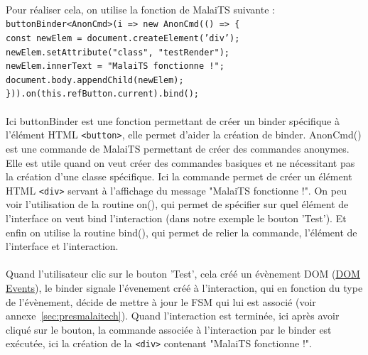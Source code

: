 \documentclass[11pt, a4paper, pdftex]{article}
\newcommand{\info}{\texttt}
\begin{document}
\begin{appendices}
        \paragraph{}
            Pour réaliser cela, on utilise la fonction de MalaiTS suivante : \\
        \info{buttonBinder<AnonCmd>(i => new AnonCmd(() => \{ \\
        const newElem = document.createElement('div'); \\
        newElem.setAttribute("class", "testRender"); \\
        newElem.innerText = "MalaiTS fonctionne !"; \\
        document.body.appendChild(newElem); \\
        \})).on(this.refButton.current).bind();}
        \paragraph{}
            Ici buttonBinder est une fonction permettant de créer un binder spécifique à l'élément HTML \info{<button>}, elle permet d'aider la création de binder.
            AnonCmd() est une commande de MalaiTS permettant de créer des commandes anonymes.
            Elle est utile quand on veut créer des commandes basiques et ne nécessitant pas la création d'une classe spécifique.
            Ici la commande permet de créer un élément HTML \info{<div>} servant à l'affichage du message "MalaiTS fonctionne !".
            On peu voir l'utilisation de la routine on(), qui permet de spécifier sur quel élément de l'interface on veut bind l'interaction (dans notre exemple le bouton 'Test').
            Et enfin on utilise la routine bind(), qui permet de relier la commande, l'élément de l'interface et l'interaction.
        \paragraph{}
            Quand l'utilisateur clic sur le bouton 'Test', cela créé un évènement DOM (\href{https://developer.mozilla.org/en-US/docs/Web/Events}{DOM Events}), le binder signale l'évenement créé à l'interaction, qui en fonction du type de l'évènement,
            décide de mettre à jour le FSM qui lui est associé (voir annexe~\ref{sec:presmalaitech}).
            Quand l'interaction est terminée, ici après avoir cliqué sur le bouton, la commande associée à l'interaction par le binder est exécutée, ici la création de la \info{<div>} contenant "MalaiTS fonctionne !".



\end{appendices}
\end{document}
